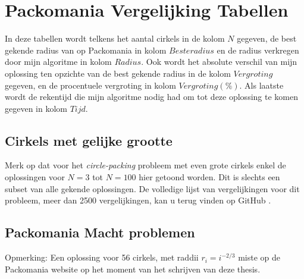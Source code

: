 \documentclass[12pt,a4paper,oneside]{book}
\begin{document}
\chapter{Packomania Vergelijking Tabellen} \label{append:packomania-tabellen}

In deze tabellen wordt telkens het aantal cirkels in de kolom $N$ gegeven, de best gekende radius van op Packomania in kolom $Beste radius$ en de radius verkregen door mijn algoritme in kolom $Radius$.
Ook wordt het absolute verschil van mijn oplossing ten opzichte van de best gekende radius in de kolom $Vergroting$ gegeven, en de procentuele vergroting in kolom $Vergroting (\%)$.
Als laatste wordt de rekentijd die mijn algoritme nodig had om tot deze oplossing te komen gegeven in kolom $Tijd$.

\section{Cirkels met gelijke grootte} \label{append:packomania-tabellen-gelijke-grootte}

Merk op dat voor het \textit{circle-packing} probleem met even grote cirkels enkel de oplossingen voor $N=3$ tot $N=100$ hier getoond worden.
Dit is slechts een subset van alle gekende oplossingen.
De volledige lijst van vergelijkingen voor dit probleem, meer dan 2500 vergelijkingen, kan u terug vinden op GitHub \cite{packomania-tables-github}.

 \label{table:packomania-equal}

\section{Packomania Macht problemen} \label{append:packomania-tabellen-macht}

 \label{table:packomania-i}

 \label{table:packomania-i^1/2}

 \label{table:packomania-i^-1/5}

 \label{table:packomania-i^-1/2}

 \label{table:packomania-i^-2/3}

Opmerking: Een oplossing voor 56 cirkels, met raddii $r_i=i^{-2/3}$ miste op de Packomania website op het moment van het schrijven van deze thesis.
\end{document}
